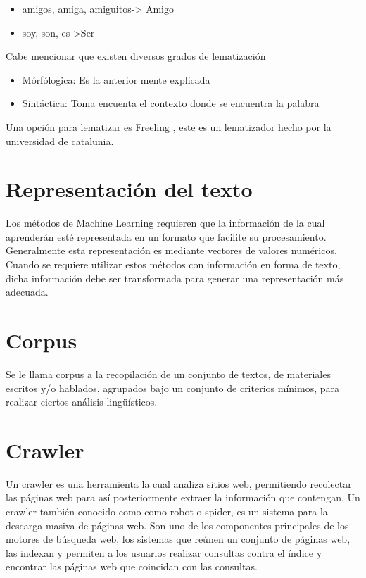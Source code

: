 	\begin{itemize}
		\item amigos, amiga, amiguitos-> Amigo
		\item soy, son, es->Ser
	\end{itemize}

Cabe mencionar que existen diversos grados de lematización

	\begin{itemize}
		\item Mórfólogica: Es la anterior mente explicada
		\item Sintáctica: Toma encuenta el contexto donde se encuentra la palabra

	\end{itemize}

Una opción para lematizar es Freeling \citep{CT18}, este es un lematizador hecho por la
universidad de catalunia.

\section[Representación del t.]{Representación del texto}
Los métodos de Machine Learning requieren que la información de la cual aprenderán esté representada en un
formato que facilite su procesamiento. Generalmente esta representación es mediante vectores de valores numéricos. 
Cuando se requiere utilizar estos métodos con información en forma de texto, dicha
información debe ser transformada para generar una representación más adecuada. 

\section{Corpus}
Se le llama corpus a la recopilación de un conjunto de textos, de materiales escritos y/o hablados, 
agrupados bajo un conjunto de criterios mínimos, para realizar ciertos análisis lingüísticos.


\section{Crawler}
Un crawler \citep{CT14} es una herramienta la cual analiza sitios web, permitiendo recolectar 
las páginas web para así posteriormente extraer la información que contengan. Un crawler también 
conocido como como robot o spider, es un sistema para la descarga masiva de páginas web. Son uno de 
los componentes principales de los motores de búsqueda web, los sistemas que reúnen un conjunto de 
páginas web, las indexan y permiten a los usuarios realizar consultas contra el índice y encontrar las 
páginas web que coincidan con las consultas.


